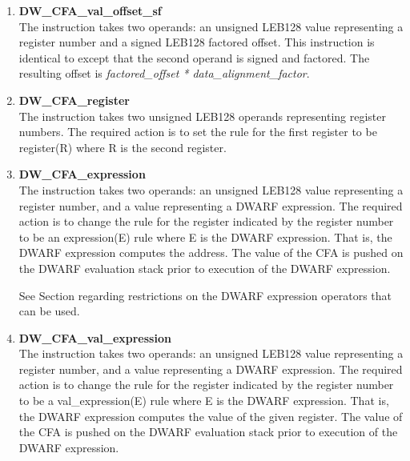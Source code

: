 \begin{enumerate}[1.]
\item \textbf{DW\-\_CFA\-\_val\-\_offset\-\_sf} \\
The  instruction takes two operands: an
unsigned LEB128 value representing a register number and a
signed LEB128 factored offset. This instruction is identical
to  except that the second operand is signed
and factored. The resulting offset is 
\textit{factored\_offset * data\_alignment\_factor}.

\item \textbf{DW\-\_CFA\-\_register} \\
The  instruction takes two unsigned LEB128
operands representing register numbers. The required action
is to set the rule for the first register to be register(R)
where R is the second register.

\item \textbf{DW\-\_CFA\-\_expression} \\
The  
instruction takes two operands: an
unsigned LEB128 value representing a register number, and
a  
value representing a DWARF expression. 
The
required action is to change the rule for the register
indicated by the register number to be an expression(E)
rule where E is the DWARF expression. That is, the DWARF
expression computes the address. The value of the CFA is
pushed on the DWARF evaluation stack prior to execution of
the DWARF expression.

See Section  
regarding restrictions on the DWARF
expression operators that can be used.

\item \textbf{DW\-\_CFA\-\_val\-\_expression} \\
The  instruction takes two operands:
an unsigned LEB128 value representing a register number, and
a  
value representing a DWARF expression. The
required action is to change the rule for the register
indicated by the register number to be a val\_expression(E)
rule where E is the DWARF expression. That is, the DWARF
expression computes the value of the given register. The value
of the CFA is pushed on the DWARF evaluation stack prior to
execution of the DWARF expression.


\end{enumerate}
